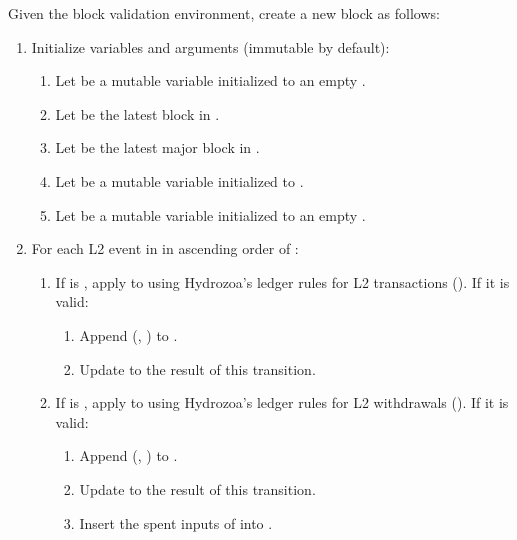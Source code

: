 \documentclass[../hydrozoa.tex]{subfiles}
\begin{document}
Given the block validation environment, create a new block as follows:
\begin{enumerate}
  \item Initialize variables and arguments (immutable by default):
    \begin{enumerate}
      \item Let  be a mutable variable initialized to an empty .
      \item Let  be the latest block in .
      \item Let  be the latest major block in .
      \item Let  be a mutable variable initialized to .
      \item Let  be a mutable variable initialized to an empty .
    \end{enumerate}
  \item For each L2 event  in  in ascending order of :
      \begin{enumerate}
        \item If  is , apply  to  using Hydrozoa's ledger rules for L2 transactions ().
          If it is valid:
          \begin{enumerate}
            \item Append (, ) to .
            \item Update  to the result of this transition.
          \end{enumerate}
        \item If  is , apply  to  using Hydrozoa's ledger rules for L2 withdrawals ().
          If it is valid:
          \begin{enumerate}
            \item Append (, ) to .
            \item Update  to the result of this transition.
            \item Insert the spent inputs of  into .

\end{enumerate}
\end{enumerate}
\end{enumerate}
\end{document}

